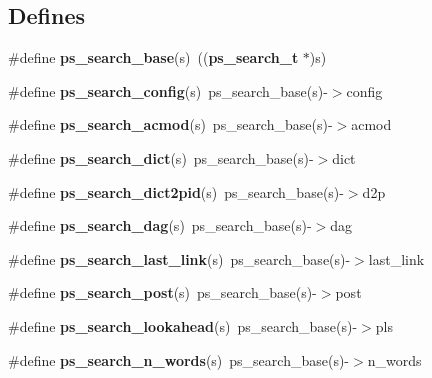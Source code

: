 \subsection*{\-Defines}
\begin{DoxyCompactItemize}
\item 
\#define {\bfseries ps\-\_\-search\-\_\-base}(s)~(({\bf ps\-\_\-search\-\_\-t} $\ast$)s)\label{pocketsphinx__internal_8h_a27058b099b21336e1fd50299f8596171}

\item 
\#define {\bfseries ps\-\_\-search\-\_\-config}(s)~ps\-\_\-search\-\_\-base(s)-\/$>$config\label{pocketsphinx__internal_8h_a856f984d97ce3d4ac640f1a9061065cf}

\item 
\#define {\bfseries ps\-\_\-search\-\_\-acmod}(s)~ps\-\_\-search\-\_\-base(s)-\/$>$acmod\label{pocketsphinx__internal_8h_a03b1edeb67c83451296c2d99b22621a9}

\item 
\#define {\bfseries ps\-\_\-search\-\_\-dict}(s)~ps\-\_\-search\-\_\-base(s)-\/$>$dict\label{pocketsphinx__internal_8h_ae2aad02cace01fbb2f345a0ead69c672}

\item 
\#define {\bfseries ps\-\_\-search\-\_\-dict2pid}(s)~ps\-\_\-search\-\_\-base(s)-\/$>$d2p\label{pocketsphinx__internal_8h_a5c91d7c3f11ba5b938705d1fe65676f9}

\item 
\#define {\bfseries ps\-\_\-search\-\_\-dag}(s)~ps\-\_\-search\-\_\-base(s)-\/$>$dag\label{pocketsphinx__internal_8h_a90e5addd9875c355d99208246802f7d8}

\item 
\#define {\bfseries ps\-\_\-search\-\_\-last\-\_\-link}(s)~ps\-\_\-search\-\_\-base(s)-\/$>$last\-\_\-link\label{pocketsphinx__internal_8h_a9ae7d942e4206b4184cc073a87d2dc82}

\item 
\#define {\bfseries ps\-\_\-search\-\_\-post}(s)~ps\-\_\-search\-\_\-base(s)-\/$>$post\label{pocketsphinx__internal_8h_ac8707bfd426dfd0eceb1e57836c0ac91}

\item 
\#define {\bfseries ps\-\_\-search\-\_\-lookahead}(s)~ps\-\_\-search\-\_\-base(s)-\/$>$pls\label{pocketsphinx__internal_8h_a890584ac65d28cd404d66adf631fac7c}

\item 
\#define {\bfseries ps\-\_\-search\-\_\-n\-\_\-words}(s)~ps\-\_\-search\-\_\-base(s)-\/$>$n\-\_\-words\label{pocketsphinx__internal_8h_aaba5c849ae487b5a3fff0210f4687e25}


\end{DoxyCompactItemize}
